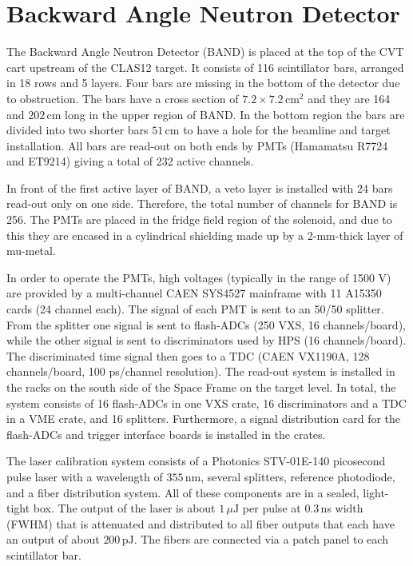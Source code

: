 \section{Backward Angle Neutron Detector}

The Backward Angle Neutron Detector (BAND) is placed at the top of the CVT cart upstream of
the CLAS12 target. It consists of 116 scintillator bars, arranged in 18 rows and 5 layers.
Four bars are missing in the bottom of the detector due to obstruction. The bars have a cross
section of $7.2 \times 7.2\,\mathrm{cm}^{2}$ and they are 164 and $202\,\mathrm{cm}$ long in the
upper region of BAND. In the bottom region the bars are divided into two shorter bars
$51\,\mathrm{cm}$ to have a hole for the beamline and target installation. All bars are read-out
on both ends by PMTs (Hamamatsu R7724 and ET9214) giving a total of 232 active channels. 

In front of the first active layer of BAND, a veto layer is installed with 24 bars read-out only
on one side. Therefore, the total number of channels for BAND is 256.
The PMTs are placed in the fridge field region of the solenoid, and due to this they are encased in
a cylindrical shielding made up by a 2-mm-thick layer of mu-metal.

In order to operate the PMTs, high voltages (typically in the range of 1500 V) are provided by a
multi-channel CAEN SYS4527 mainframe with 11 A15350 cards (24 channel each).
The signal of each PMT is sent to an 50/50 splitter.
From the splitter one signal is sent to flash-ADCs (250 VXS, 16 channels/board), while the other
signal is sent to discriminators used by HPS (16 channels/board).
The discriminated time signal then goes to a TDC (CAEN VX1190A, 128 channels/board, 100 ps/channel
resolution). The read-out system is installed in the racks on the south side of the Space Frame on
the target level. 
In total, the system consists of 16 flash-ADCs in one VXS crate, 16 discriminators and a TDC in a
VME crate, and 16 splitters. Furthermore, a signal distribution card for the flash-ADCs and trigger
interface boards is installed in the crates.

The laser calibration system consists of a Photonics STV-01E-140 picosecond pulse laser with a
wavelength of $355\,\mathrm{nm}$, several splitters, reference photodiode, and a fiber distribution
system. All of these components are in a sealed, light-tight box. The output of the laser is about
$1\,\mu\mathrm{J}$ per pulse at $0.3\,$ns width (FWHM) that is attenuated and distributed to all
fiber outputs that each have an output of about $200\,\mathrm{pJ}$. The fibers are connected via a
patch panel to each scintillator bar.

